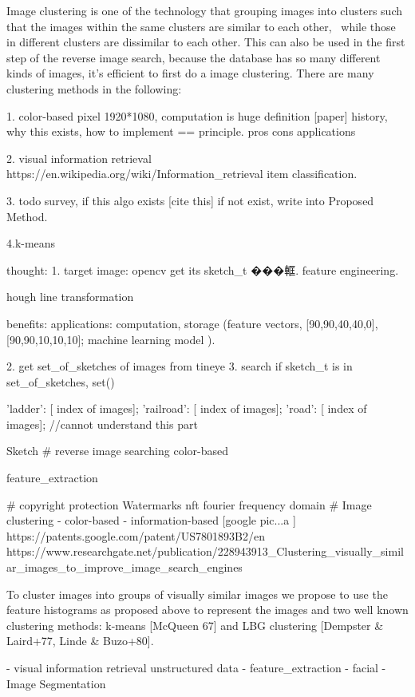Image clustering is one of the technology that grouping images into clusters such that the images within the same clusters are similar to each other, \
while those in different clusters are dissimilar to each other.
This can also be used in the first step of the reverse image search,
because the database has so many different kinds of images,
it's efficient to first do a image clustering.
There are many clustering methods in the following:

1. color-based pixel
1920*1080, computation is huge
definition [paper] \cite{}
history, why this exists, 
how to implement == principle.
pros cons
applications

2. visual information retrieval
https://en.wikipedia.org/wiki/Information_retrieval
item classification.


3. todo survey, if this algo exists [cite this]
if not exist, write into Proposed Method.

4.k-means





thought:
1. target image: opencv get its sketch_t ���軭.  feature engineering.

hough line transformation

benefits:
applications:
computation, storage (feature vectors, [90,90,40,40,0], [90,90,10,10,10];
        machine learning model ).

2. get set_of_sketches of images from tineye
3. search if sketch_t is in set_of_sketches, set()

{
'ladder': [ index of images];
'railroad': [ index of images];
'road': [ index of images];
}
//cannot understand this part
















Sketch
# reverse image searching
    color-based

    feature_extraction   

# copyright protection
    Watermarks  nft fourier frequency domain
# Image clustering
    - color-based
    - information-based [google pic...a ]
    https://patents.google.com/patent/US7801893B2/en  
    https://www.researchgate.net/publication/228943913_Clustering_visually_similar_images_to_improve_image_search_engines  {

To cluster images into groups of visually similar images we propose to use the feature histograms as proposed above to represent the images and two well known clustering methods: k-means [McQueen 67] and LBG clustering [Dempster & Laird+77, Linde & Buzo+80]. 
    }
        - visual information retrieval
         unstructured data
        - feature_extraction   
        - facial 
        - Image Segmentation  

